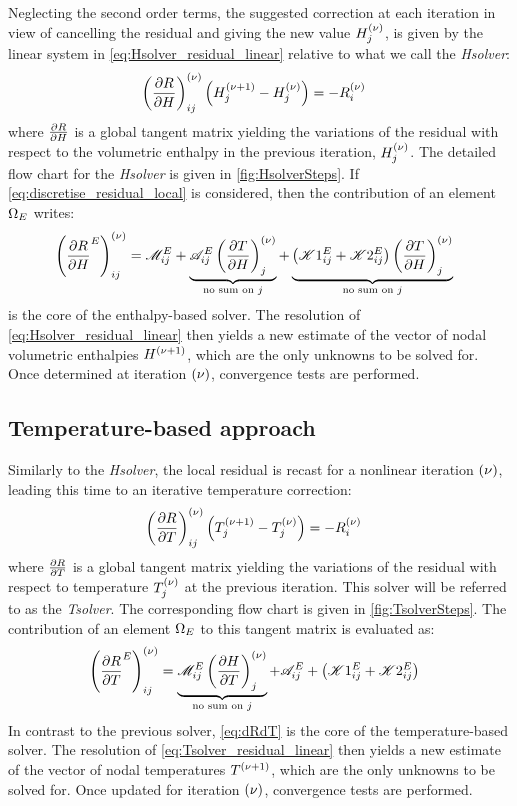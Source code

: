 Neglecting the second order terms, the suggested correction at each iteration in view of cancelling 
the residual and giving the new value $H_j^{{\left( \nu \right)}}$, is given by the linear system in \cref{eq:Hsolver_residual_linear}
relative to what we call the \emph{Hsolver}:
\begin{align}
\label{eq:Hsolver_residual_linear}
& \left( \frac{\partial R}{\partial H} \right)^{{\left( \nu \right)}}_{ij} \left( H_j^{{\left( \nu+1 \right)}} - H_j^{{\left( \nu \right)}} \right) = -R_i^{{\left( \nu \right)}}
\end{align}
where $\frac{\partial R}{\partial H}$ is a global tangent matrix yielding the variations of the residual with respect to the volumetric enthalpy 
in the previous iteration, $H_j^{{\left( \nu \right)}}$. The detailed flow chart for the \emph{Hsolver} is given in \cref{fig:HsolverSteps}.
If \cref{eq:discretise_residual_local} is considered, then the contribution of an element $\Omega_E$ writes:
\begin{align}
\label{eq:dRdH}
& \left( \frac{\partial R}{\partial H}^E \right)^{{\left( \nu \right)}}_{ij} 
= \mathscr{M}_{ij}^E 
+ \underbrace{\mathscr{A}_{ij}^E \left( \frac{\partial T}{\partial H} \right)^{{\left( \nu \right)}}_{j}}_{\text{no sum on }j}
+ \underbrace{\left( \mathscr{K}1_{ij}^E + \mathscr{K}2_{ij}^E \right) \left( \frac{\partial T}{\partial H} \right)^{{\left( \nu \right)}}_{j}}_{\text{no sum on }j}
\end{align}
 is the core of the enthalpy-based solver. The resolution of \cref{eq:Hsolver_residual_linear} 
then yields a new estimate of the vector of nodal volumetric enthalpies $H^{{\left( \nu+1 \right)}}$, which are the only unknowns to be solved for. 
Once determined at iteration ${\left( \nu \right)}$, convergence tests are performed.


\subsection{Temperature-based approach }

Similarly to the \emph{Hsolver}, the local residual is recast for a nonlinear iteration ${\left( \nu \right)}$, 
leading this time to an iterative temperature correction:
\begin{align}
\label{eq:Tsolver_residual_linear}
& \left( \frac{\partial R}{\partial T} \right)^{{\left( \nu \right)}}_{ij} \left( T_j^{{\left( \nu+1 \right)}} - T_j^{{\left( \nu \right)}} \right) = -R_i^{{\left( \nu \right)}}
\end{align}
where $\frac{\partial R}{\partial T}$ is a global tangent matrix yielding the variations of the residual with respect to temperature $T_j^{{\left( \nu \right)}}$ at the previous iteration. 
This solver will be referred to as the \emph{Tsolver}. The corresponding flow chart is given in \cref{fig:TsolverSteps}.
The contribution of an element $\Omega_E$ to this tangent matrix is evaluated as:
\begin{align}
\label{eq:dRdT}
& \left( \frac{\partial R}{\partial T}^E \right)^{{\left( \nu \right)}}_{ij}
= \underbrace{\mathscr{M}_{ij}^E \left( \frac{\partial H}{\partial T} \right)^{{\left( \nu \right)}}_{j}}_{\text{no sum on }j}
+ \mathscr{A}_{ij}^E
+ \left( \mathscr{K}1_{ij}^E + \mathscr{K}2_{ij}^E \right)
\end{align}
In contrast to the previous solver, \cref{eq:dRdT} is the core of the temperature-based solver. The resolution of \cref{eq:Tsolver_residual_linear} 
then yields a new estimate of the vector of nodal temperatures $T^{{\left( \nu+1 \right)}}$, which are the only unknowns to be solved for. 
Once updated for iteration ${\left( \nu \right)}$, convergence tests are performed.
%
%
